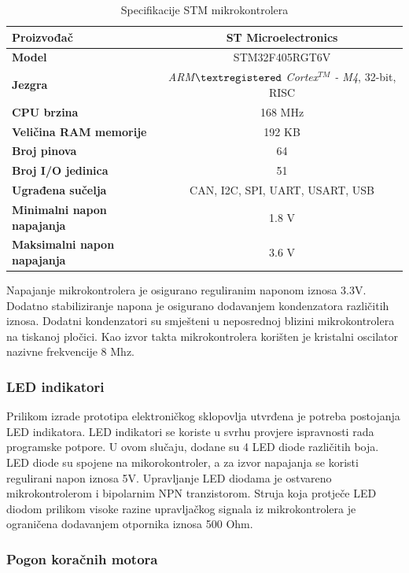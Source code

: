 \documentclass[11pt,a4paper]{article}
\begin{document}
\begin{table}[H]
	\centering
	\caption{Specifikacije STM mikrokontrolera}
	\label{tab:specifikacija_MCU}
	\begin{tabular}{|l|c|}
		\hline
		\textbf{Proizvođač} & ST Microelectronics \\ \hline 
		\textbf{Model} &  STM32F405RGT6V \\ \hline 
		\textbf{Jezgra} & \textit{ ARM$\textregistered$ Cortex$^{TM}$ - M4}, 32-bit, RISC  \\ \hline 
		\textbf{CPU brzina} & 168 MHz \\ \hline 
		\textbf{Veličina RAM memorije} & 192 KB \\ \hline 
		\textbf{Broj pinova} & 64 \\ \hline 
		\textbf{Broj I/O jedinica} & 51 \\ \hline 
		\textbf{Ugrađena sučelja} & CAN, I2C, SPI, UART, USART, USB\\ \hline 
		\textbf{Minimalni napon napajanja} & 1.8 V\\ \hline 
		\textbf{Maksimalni napon napajanja} & 3.6 V\\ \hline 
	\end{tabular}
\end{table}

Napajanje mikrokontrolera je osigurano reguliranim naponom iznosa 3.3V. Dodatno stabiliziranje napona je osigurano dodavanjem kondenzatora različitih iznosa. Dodatni kondenzatori su smješteni u neposrednoj blizini mikrokontrolera na tiskanoj pločici. Kao izvor takta mikrokontrolera korišten je kristalni oscilator nazivne frekvencije 8 Mhz.

\subsubsection{LED indikatori}
Prilikom izrade prototipa elektroničkog sklopovlja utvrđena je potreba postojanja LED indikatora. LED indikatori se koriste u svrhu provjere ispravnosti rada programske potpore. U ovom slučaju, dodane su 4 LED diode različitih boja. LED diode su spojene na mikorokontroler, a za izvor napajanja se koristi regulirani napon iznosa 5V. Upravljanje LED diodama je ostvareno mikrokontrolerom i bipolarnim NPN tranzistorom. Struja koja protječe LED diodom prilikom visoke razine upravljačkog signala iz mikrokontrolera je ograničena dodavanjem otpornika iznosa 500 Ohm. 


\subsubsection{Pogon koračnih motora}
\end{document}
